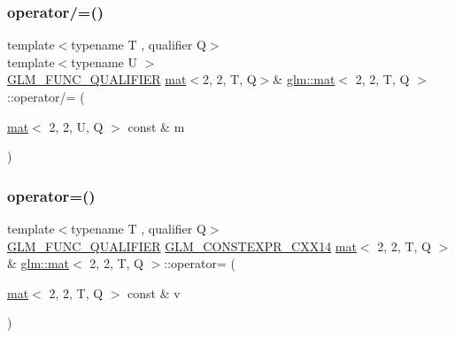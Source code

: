 \mbox{\label{structglm_1_1mat_3_012_00_012_00_01_t_00_01_q_01_4_a2ccd7dd34be3dad08262d075de391ed8}} 
\subsubsection{\texorpdfstring{operator/=()}{operator/=()}\hspace{0.1cm}{\footnotesize\ttfamily [4/4]}}
{\footnotesize\ttfamily template$<$typename T , qualifier Q$>$ \\
template$<$typename U $>$ \\
\mbox{\hyperlink{setup_8hpp_a33fdea6f91c5f834105f7415e2a64407}{G\+L\+M\+\_\+\+F\+U\+N\+C\+\_\+\+Q\+U\+A\+L\+I\+F\+I\+ER}} \mbox{\hyperlink{structglm_1_1mat}{mat}}$<$2, 2, T, Q$>$\& \mbox{\hyperlink{structglm_1_1mat}{glm\+::mat}}$<$ 2, 2, T, Q $>$\+::operator/= (\begin{DoxyParamCaption}\item[{\mbox{\hyperlink{structglm_1_1mat}{mat}}$<$ 2, 2, U, Q $>$ const \&}]{m }\end{DoxyParamCaption})}

\mbox{\label{structglm_1_1mat_3_012_00_012_00_01_t_00_01_q_01_4_a8ee5f3e6cd86052e0ac2119f3ef52358}} 
\subsubsection{\texorpdfstring{operator=()}{operator=()}\hspace{0.1cm}{\footnotesize\ttfamily [1/3]}}
{\footnotesize\ttfamily template$<$typename T , qualifier Q$>$ \\
\mbox{\hyperlink{setup_8hpp_a33fdea6f91c5f834105f7415e2a64407}{G\+L\+M\+\_\+\+F\+U\+N\+C\+\_\+\+Q\+U\+A\+L\+I\+F\+I\+ER}} \mbox{\hyperlink{setup_8hpp_a4dd12abf5e1164bc57f3a34671d03844}{G\+L\+M\+\_\+\+C\+O\+N\+S\+T\+E\+X\+P\+R\+\_\+\+C\+X\+X14}} \mbox{\hyperlink{structglm_1_1mat}{mat}}$<$ 2, 2, T, Q $>$ \& \mbox{\hyperlink{structglm_1_1mat}{glm\+::mat}}$<$ 2, 2, T, Q $>$\+::operator= (\begin{DoxyParamCaption}\item[{\mbox{\hyperlink{structglm_1_1mat}{mat}}$<$ 2, 2, T, Q $>$ const \&}]{v }\end{DoxyParamCaption})}

